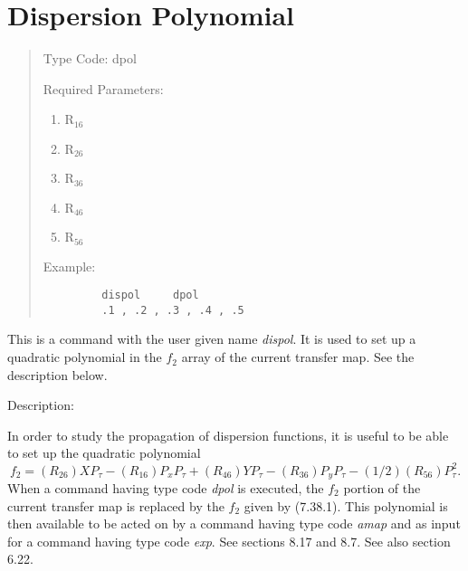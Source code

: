 \newpage
\section{Dispersion Polynomial}
\begin{quotation}
\noindent Type Code:  dpol
\vspace{5mm}

\noindent Required Parameters:
\begin{enumerate}
     \item  $\mbox{R}_{16}$
     \item  $\mbox{R}_{26}$
     \item  $\mbox{R}_{36}$
     \item  $\mbox{R}_{46}$
     \item  $\mbox{R}_{56}$

\end{enumerate}

\vspace{5mm}
\noindent Example:
\begin{verbatim}
         dispol     dpol
         .1 , .2 , .3 , .4 , .5
\end{verbatim}
\end{quotation}
This is a command with the user given name {\em dispol}.  It is used
to set up a quadratic polynomial in the $f_2$ array of the current
transfer map.  See the description below.

\vspace{5mm}
     Description:
\vspace{2mm}

In order to study the propagation of dispersion functions, it is useful
to be able to set up the quadratic polynomial
\begin{equation}
f_2 = (R_{26}) XP_{\tau} - (R_{16}) P_x P_{\tau} + (R_{46})
YP_{\tau} - (R_{36}) P_y P_{\tau} - (1/2)(R_{56}) P^2_{\tau}.
\end{equation}
When a command having type code {\em dpol} is executed, the $f_2$ portion
of the current transfer map is replaced by the $f_2$ given by (7.38.1).
This polynomial is then available to be acted on by a command having type
code {\em amap} and as input for a command having type code {\em exp}.
See sections 8.17 and 8.7.  See also section 6.22.

\newpage
